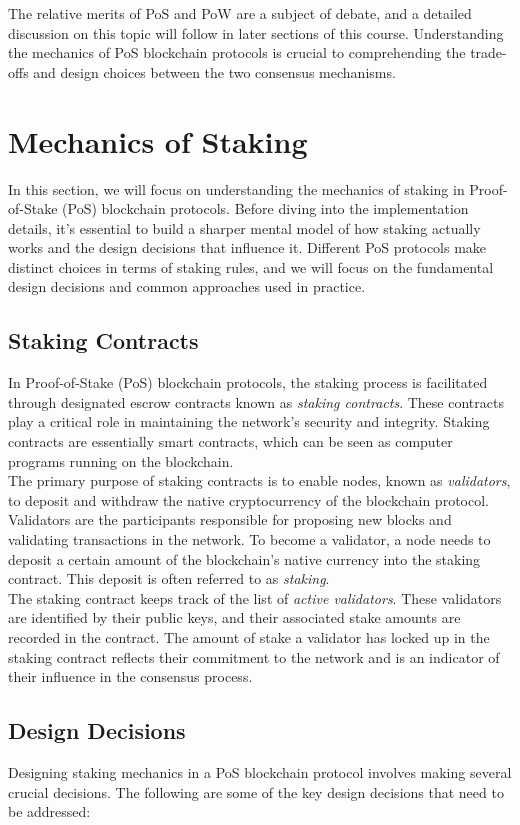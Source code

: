 The relative merits of PoS and PoW are a subject of debate, and a detailed discussion on this topic will follow in later sections of this course. Understanding the mechanics of PoS blockchain protocols is crucial to comprehending the trade-offs and design choices between the two consensus mechanisms.

\section{Mechanics of Staking}
In this section, we will focus on understanding the mechanics of staking in Proof-of-Stake (PoS) blockchain protocols. Before diving into the implementation details, it's essential to build a sharper mental model of how staking actually works and the design decisions that influence it. Different PoS protocols make distinct choices in terms of staking rules, and we will focus on the fundamental design decisions and common approaches used in practice.

\subsection{Staking Contracts}
In Proof-of-Stake (PoS) blockchain protocols, the staking process is facilitated through designated escrow contracts known as \textit{staking contracts}. These contracts play a critical role in maintaining the network's security and integrity. Staking contracts are essentially smart contracts, which can be seen as computer programs running on the blockchain.\\
The primary purpose of staking contracts is to enable nodes, known as \textit{validators}, to deposit and withdraw the native cryptocurrency of the blockchain protocol. Validators are the participants responsible for proposing new blocks and validating transactions in the network. To become a validator, a node needs to deposit a certain amount of the blockchain's native currency into the staking contract. This deposit is often referred to as \textit{staking}.\\
The staking contract keeps track of the list of \textit{active validators}. These validators are identified by their public keys, and their associated stake amounts are recorded in the contract. The amount of stake a validator has locked up in the staking contract reflects their commitment to the network and is an indicator of their influence in the consensus process.

\subsection{Design Decisions}
Designing staking mechanics in a PoS blockchain protocol involves making several crucial decisions. The following are some of the key design decisions that need to be addressed:

